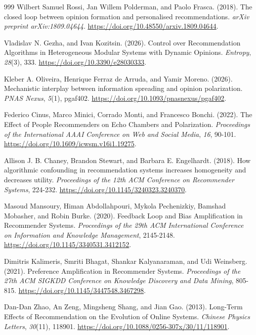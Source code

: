 \begin{thebibliography}{999}
Wilbert Samuel Rossi, Jan Willem Polderman, and Paolo Frasca. (2018). The closed loop between opinion formation and personalised recommendations. \textit{arXiv preprint arXiv:1809.04644}. \url{https://doi.org/10.48550/arxiv.1809.04644}.

Vladislav N. Gezha, and Ivan Kozitsin. (2026). Control over Recommendation Algorithms in Heterogeneous Modular Systems with Dynamic Opinions. \textit{Entropy}, \textit{28}(3), 333. \url{https://doi.org/10.3390/e28030333}.

Kleber A. Oliveira, Henrique Ferraz de Arruda, and Yamir Moreno. (2026). Mechanistic interplay between information spreading and opinion polarization. \textit{PNAS Nexus}, \textit{5}(1), pgaf402. \url{https://doi.org/10.1093/pnasnexus/pgaf402}.

Federico Cinus, Marco Minici, Corrado Monti, and Francesco Bonchi. (2022). The Effect of People Recommenders on Echo Chambers and Polarization. \textit{Proceedings of the International AAAI Conference on Web and Social Media}, \textit{16}, 90-101. \url{https://doi.org/10.1609/icwsm.v16i1.19275}.

Allison J. B. Chaney, Brandon Stewart, and Barbara E. Engelhardt. (2018). How algorithmic confounding in recommendation systems increases homogeneity and decreases utility. \textit{Proceedings of the 12th ACM Conference on Recommender Systems}, 224-232. \url{https://doi.org/10.1145/3240323.3240370}.

Masoud Mansoury, Himan Abdollahpouri, Mykola Pechenizkiy, Bamshad Mobasher, and Robin Burke. (2020). Feedback Loop and Bias Amplification in Recommender Systems. \textit{Proceedings of the 29th ACM International Conference on Information and Knowledge Management}, 2145-2148. \url{https://doi.org/10.1145/3340531.3412152}.

Dimitris Kalimeris, Smriti Bhagat, Shankar Kalyanaraman, and Udi Weinsberg. (2021). Preference Amplification in Recommender Systems. \textit{Proceedings of the 27th ACM SIGKDD Conference on Knowledge Discovery and Data Mining}, 805-815. \url{https://doi.org/10.1145/3447548.3467298}.

Dan-Dan Zhao, An Zeng, Mingsheng Shang, and Jian Gao. (2013). Long-Term Effects of Recommendation on the Evolution of Online Systems. \textit{Chinese Physics Letters}, \textit{30}(11), 118901. \url{https://doi.org/10.1088/0256-307x/30/11/118901}.


\end{thebibliography}
